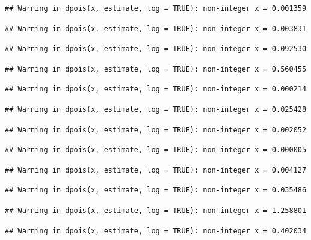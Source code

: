 \documentclass[]{article}
\begin{document}
\begin{verbatim}
## Warning in dpois(x, estimate, log = TRUE): non-integer x = 0.001359
\end{verbatim}

\begin{verbatim}
## Warning in dpois(x, estimate, log = TRUE): non-integer x = 0.003831
\end{verbatim}

\begin{verbatim}
## Warning in dpois(x, estimate, log = TRUE): non-integer x = 0.092530
\end{verbatim}

\begin{verbatim}
## Warning in dpois(x, estimate, log = TRUE): non-integer x = 0.560455
\end{verbatim}

\begin{verbatim}
## Warning in dpois(x, estimate, log = TRUE): non-integer x = 0.000214
\end{verbatim}

\begin{verbatim}
## Warning in dpois(x, estimate, log = TRUE): non-integer x = 0.025428
\end{verbatim}

\begin{verbatim}
## Warning in dpois(x, estimate, log = TRUE): non-integer x = 0.002052
\end{verbatim}

\begin{verbatim}
## Warning in dpois(x, estimate, log = TRUE): non-integer x = 0.000005
\end{verbatim}

\begin{verbatim}
## Warning in dpois(x, estimate, log = TRUE): non-integer x = 0.004127
\end{verbatim}

\begin{verbatim}
## Warning in dpois(x, estimate, log = TRUE): non-integer x = 0.035486
\end{verbatim}

\begin{verbatim}
## Warning in dpois(x, estimate, log = TRUE): non-integer x = 1.258801
\end{verbatim}

\begin{verbatim}
## Warning in dpois(x, estimate, log = TRUE): non-integer x = 0.402034
\end{verbatim}
\end{document}
